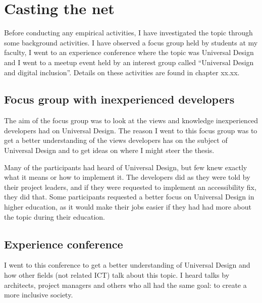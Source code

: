 \section{Casting the net}
Before conducting any empirical activities, I have investigated the topic through some background activities. I have observed a focus group held by students at my faculty, I went to an experience conference where the topic was Universal Design and I went to a meetup event held by an interest group called “Universal Design and digital inclusion”. Details on these activities are found in chapter xx.xx.

\subsection{Focus group with inexperienced developers}
The aim of the focus group was to look at the views and knowledge inexperienced developers had on Universal Design. The reason I went to this focus group was to get a better understanding of the views developers has on the subject of Universal Design and to get ideas on where I might steer the thesis.

Many of the participants had heard of Universal Design, but few knew exactly what it means or how to implement it. The developers did as they were told by their project leaders, and if they were requested to implement an accessibility fix, they did that. Some participants requested a better focus on Universal Design in higher education, as it would make their jobs easier if they had had more about the topic during their education.

\subsection{Experience conference}
I went to this conference to get a better understanding of Universal Design and how other fields (not related ICT) talk about this topic. I heard talks by architects, project managers and others who all had the same goal: to create a more inclusive society. 

